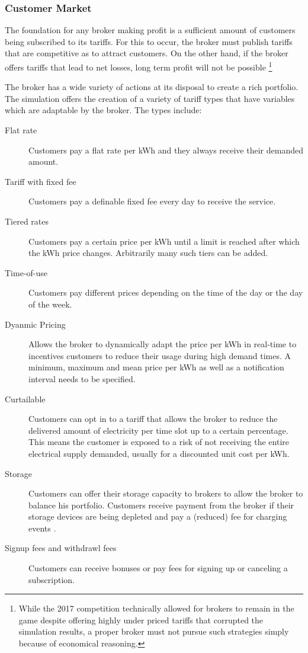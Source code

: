 \subsubsection{Customer Market}

The foundation for any broker making profit is a sufficient amount of customers being subscribed to its tariffs. For
this to occur, the broker must publish tariffs that are competitive as to attract customers. On the other hand, if the
broker offers tariffs that lead to net losses, long term profit will not be possible
\footnote{While the 2017
    competition technically allowed for brokers to remain in the game despite offering highly under priced tariffs that
    corrupted the simulation results, a proper broker must not pursue such strategies simply because of economical
reasoning.}

The broker has a wide variety of actions at its disposal to create a rich portfolio. The simulation offers the
creation of a variety of tariff types that have variables which are adaptable by the broker. The types include:

\begin{description}
    \item[Flat rate] Customers pay a flat rate per kWh and they always receive their demanded
        amount.
    \item[Tariff with fixed fee] Customers pay a definable fixed fee every day to receive the service.
    \item [Tiered rates] Customers pay a certain price per kWh until a limit is reached after which the kWh price
        changes.  Arbitrarily many such tiers can be added.  \item[Time-of-use] Customers pay different prices depending
        on the time of the day or the day of the week.  \item[Dyanmic Pricing] Allows the broker to dynamically adapt
        the price per kWh in real-time to incentives customers to reduce their usage during high demand times. A
        minimum, maximum and mean price per kWh as well as a notification interval needs to be specified.
    \item[Curtailable] Customers can opt in to a tariff that allows the broker to reduce the delivered amount of
        electricity per time slot up to a certain percentage. This means the customer is exposed to a risk of not
        receiving the entire electrical supply demanded, usually for a discounted unit cost per kWh.  \item[Storage]
        Customers can offer their storage capacity to brokers to allow the broker to balance his portfolio. Customers
        receive payment from the broker if their storage devices are being depleted and pay a (reduced) fee for charging
        events \citep[p.9]{ketter2018powertac}.
    \item[Signup fees and withdrawl fees] Customers can receive bonuses or pay fees
        for signing up or canceling a subscription.
\end{description}

